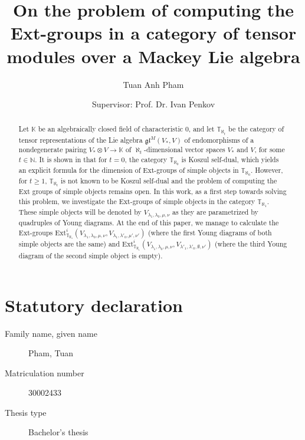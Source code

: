 \documentclass[openany, a4paper]{amsbook}
\theoremstyle{definition}
\numberwithin{equation}{chapter}
\newcommand{\T}[1]{{\mathbb{T}}_{\aleph_{#1}}}
\newcommand{\Ext}[4]{\mathrm{Ext}^{#1}_{#2}({#3}, {#4})}
\begin{document}
\frontmatter \title{ %
On the problem of computing the Ext-groups in a category of tensor modules over a Mackey Lie algebra
}

\author{Tuan Anh Pham}
\author[\null]{Supervisor: Prof. Dr. Ivan Penkov}

\begin{abstract}
  Let $\mathbb{K}$ be an algebraically closed field of characteristic 0, and let $\T{t}$ be the category of tensor representations of the Lie algebra $\mathfrak{gl}^M(V_\ast, V)$ of endomorphisms of a nondegenerate pairing $V_\ast \otimes V \to \mathbb{K}$ of $\aleph_t$-dimensional vector spaces $V_\ast$ and $V$, for some $t \in \mathbb{N}$. It is shown in \cite{cp19} that for $t =0$, the category $\T{0}$ is Koszul self-dual, which yields an explicit formula for the dimension of Ext-groups of simple objects in $\T{0}$. However, for $t \geq 1$, $\T{t}$ is not known to be Koszul self-dual and the problem of computing the Ext groups of simple objects 
  remains open. In this work, as a first step towards solving this problem, we investigate the Ext-groups of simple objects in the category $\T{1}$. These simple objects will be denoted by $V_{\lambda_1, \lambda_0, \mu, \nu}$ as they are parametrized by quadruples of Young diagrams. At the end of this paper, we manage to calculate the Ext-groups $\Ext{i}{\T{1}}{V_{\lambda_1, \lambda_0, \mu, \nu}}{V_{\lambda_1, \lambda'_0, \mu', \nu'}}$ (where the first Young diagrams of both simple objects are the same) and $\Ext{i}{\T{1}}{V_{\lambda_1, \lambda_0, \mu, \nu}}{V_{\lambda'_1, \lambda'_0, \emptyset, \nu'}}$ (where the third Young diagram of the second simple object is empty). 
\end{abstract}

\maketitle

\chapter*{Statutory declaration}

\begin{description}
\item[Family name, given name] Pham, Tuan 
\item[Matriculation number] 30002433
\item[Thesis type] Bachelor's thesis
\end{description}
\end{document}
